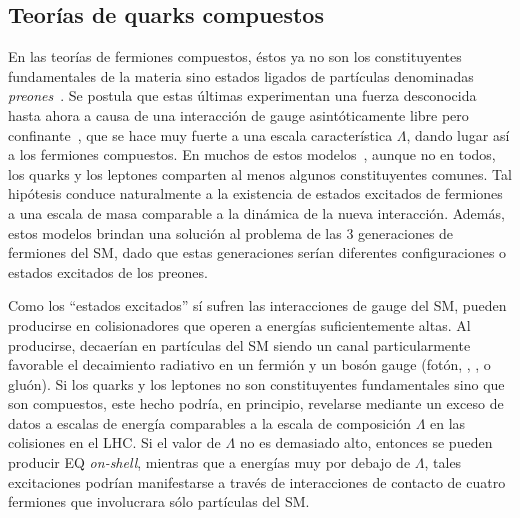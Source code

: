 \subsection{Teorías de quarks compuestos}
\label{subsec:theory:bsm:qstar}

En las teorías de fermiones compuestos, éstos ya no son los constituyentes fundamentales de la materia sino estados ligados de partículas denominadas \textit{preones}~\cite{Pfeil-1981}. Se postula que estas últimas experimentan una fuerza desconocida hasta ahora a causa de una interacción de gauge asintóticamente libre pero confinante~\cite{Hooft-1980}, que se hace muy fuerte a una escala característica \(\Lambda\), dando lugar así a los fermiones compuestos. En muchos de estos modelos~\cite{Pati_Salam_Strathdee-1975,Fritzsch_Mandelbaum-1981,Baur_Fritzsch-1984}, aunque no en todos, los quarks y los leptones comparten al menos algunos constituyentes comunes. Tal hipótesis conduce naturalmente a la existencia de estados excitados de fermiones a una escala de masa comparable a la dinámica de la nueva interacción. Además, estos modelos brindan una solución al problema de las 3 generaciones de fermiones del \ac{SM}, dado que estas generaciones serían diferentes configuraciones o estados excitados de los preones.

Como los \enquote{estados excitados} sí sufren las interacciones de gauge del \ac{SM}, pueden producirse en colisionadores que operen a energías suficientemente altas. Al producirse, decaerían en partículas del \ac{SM} siendo un canal particularmente favorable el decaimiento radiativo en un fermión y un bosón gauge (fotón, \Wboson, \Zboson, o gluón). Si los quarks y los leptones no son constituyentes fundamentales sino que son compuestos, este hecho podría, en principio, revelarse mediante un exceso de datos a escalas de energía comparables a la escala de composición \(\Lambda\) en las colisiones \pp en el \ac{LHC}. Si el valor de \(\Lambda\) no es demasiado alto, entonces se pueden producir \ac{EQ} \textit{on-shell}, mientras que a energías muy por debajo de \(\Lambda\), tales excitaciones podrían manifestarse a través de interacciones de contacto de cuatro fermiones que involucrara sólo partículas del \ac{SM}.

